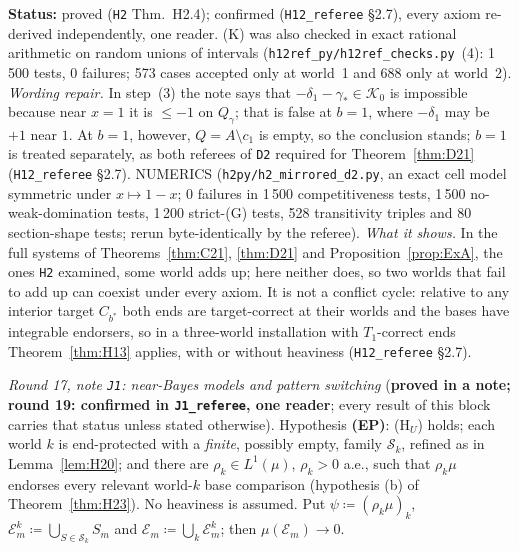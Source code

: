 \documentclass[11pt]{article}
\theoremstyle{definition}
\theoremstyle{remark}
\newcommand{\src}[1]{\texttt{#1}}
\newcommand{\status}[1]{\par\smallskip\noindent\textbf{Status:} #1\par\smallskip}
\begin{document}
\status{proved (\src{H2} Thm.~H2.4); confirmed (\src{H12\_referee} \S2.7), every axiom re-derived independently, one reader. (K) was also checked in exact rational arithmetic on random unions of intervals (\src{h12ref\_py/h12ref\_checks.py}~(4): 1\,500 tests, 0 failures; 573 cases accepted only at world~1 and 688 only at world~2). \emph{Wording repair.} In step~(3) the note says that $-\delta_1-\gamma_*\in\mathcal K_0$ is impossible because near $x=1$ it is $\le-1$ on $Q_\gamma$; that is false at $b=1$, where $-\delta_1$ may be $+1$ near $1$. At $b=1$, however, $Q=A\setminus c_1$ is empty, so the conclusion stands; $b=1$ is treated separately, as both referees of \src{D2} required for Theorem~\ref{thm:D21} (\src{H12\_referee} \S2.7). NUMERICS (\src{h2py/h2\_mirrored\_d2.py}, an exact cell model symmetric under $x\mapsto1-x$; 0 failures in 1\,500 competitiveness tests, 1\,500 no-weak-domination tests, 1\,200 strict-(G) tests, 528 transitivity triples and 80 section-shape tests; rerun byte-identically by the referee). \emph{What it shows.} In the full systems of Theorems~\ref{thm:C21}, \ref{thm:D21} and Proposition~\ref{prop:ExA}, the ones \src{H2} examined, some world adds up; here neither does, so two worlds that fail to add up can coexist under every axiom. It is not a conflict cycle: relative to any interior target $C_{b^*}$ both ends are target-correct at their worlds and the bases have integrable endorsers, so in a three-world installation with $T_1$-correct ends Theorem~\ref{thm:H13} applies, with or without heaviness (\src{H12\_referee} \S2.7).}

\emph{Round 17, note \src{J1}: near-Bayes models and pattern switching} (\textbf{proved in a note; round 19: confirmed in \src{J1\_referee}, one reader}; every result of this block carries that status unless stated otherwise). Hypothesis \textbf{(EP)}: (H$_U$) holds; each world $k$ is end-protected with a \emph{finite}, possibly empty, family $\mathcal S_k$, refined as in Lemma~\ref{lem:H20}; and there are $\rho_k\in L^1(\mu)$, $\rho_k>0$ a.e., such that $\rho_k\mu$ endorses every relevant world-$k$ base comparison (hypothesis (b) of Theorem~\ref{thm:H23}). No heaviness is assumed. Put $\psi\coloneqq(\rho_k\mu)_k$, $\mathcal E^k_m\coloneqq\bigcup_{S\in\mathcal S_k}S_m$ and $\mathcal E_m\coloneqq\bigcup_k\mathcal E^k_m$; then $\mu(\mathcal E_m)\to0$.
\end{document}
